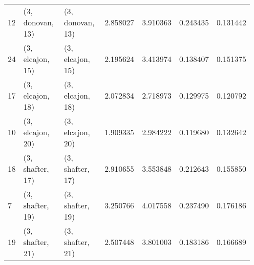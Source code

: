 \begin{tabular}{lllrrrr}
12 &  (3, donovan, 13) &  (3, donovan, 13) &  2.858027 &  3.910363 &   0.243435 &  0.131442 \\
24 &  (3, elcajon, 15) &  (3, elcajon, 15) &  2.195624 &  3.413974 &   0.138407 &  0.151375 \\
17 &  (3, elcajon, 18) &  (3, elcajon, 18) &  2.072834 &  2.718973 &   0.129975 &  0.120792 \\
10 &  (3, elcajon, 20) &  (3, elcajon, 20) &  1.909335 &  2.984222 &   0.119680 &  0.132642 \\
18 &  (3, shafter, 17) &  (3, shafter, 17) &  2.910655 &  3.553848 &   0.212643 &  0.155850 \\
7  &  (3, shafter, 19) &  (3, shafter, 19) &  3.250766 &  4.017558 &   0.237490 &  0.176186 \\
19 &  (3, shafter, 21) &  (3, shafter, 21) &  2.507448 &  3.801003 &   0.183186 &  0.166689 \\
\bottomrule
\end{tabular}
